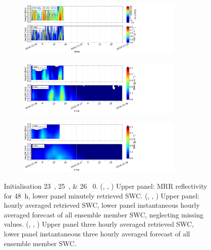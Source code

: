 \begin{figure}[t]\ContinuedFloat
	\centering
    \begin{subfigure}[t]{\textwidth}
    \centering
    	\includegraphics[trim={0.cm 2.2cm 19.cm 0.5cm},clip,width=0.9\textwidth]{./fig_obs_ret/20161226}
		\caption{}\label{fig:SWC:ret_26}
    \end{subfigure}
    \begin{subfigure}[t]{\textwidth}
    \centering
    	\includegraphics[trim={0.cm 2.2cm 19.cm 0.5cm},clip,width=0.9\textwidth]{./fig_vert_SWC_EM/20161226}
		\caption{}\label{fig:SWC_EM:26}
    \end{subfigure}
    \begin{subfigure}[t]{\textwidth}
    \centering
    	\includegraphics[trim={0.cm 0.8cm 19.cm 0.5cm},clip,width=0.9\textwidth]{./fig_vert_SWC_3h/20161226}
		\caption{}\label{fig:SWC3h:26}
    \end{subfigure}
    \caption{Initialisation \SIlist{23;25;26}{\dec} \SI{0}{\UTC}. 
    (\protect{}, \protect{}, \protect{}) Upper panel: MRR reflectivity for \SI{48}{\hour}, lower panel minutely retrieved SWC. 
    (\protect{}, \protect{}, \protect{}) Upper panel: hourly averaged retrieved SWC, lower panel instantaneous hourly averaged forecast of all ensemble member SWC, neglecting missing values. 
    (\protect{}, \protect{}, \protect{}) Upper panel three hourly averaged retrieved SWC, lower panel instantaneous three hourly averaged forecast of all ensemble member SWC.   }\label{fig:ret:SWC}
\end{figure}
